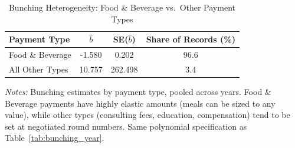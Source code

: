 \begin{table}[t]
\centering
\caption{Bunching Heterogeneity: Food \& Beverage vs.\ Other Payment Types}
\label{tab:het_type}
\begin{threeparttable}
\begin{tabular}{lccc}
\toprule
Payment Type & $\hat{b}$ & SE($\hat{b}$) & Share of Records (\%) \\
\midrule
Food \& Beverage & -1.580 & 0.202 & 96.6 \\
All Other Types & 10.757 & 262.498 & 3.4 \\
\bottomrule
\end{tabular}
\begin{tablenotes}
\item \textit{Notes:} Bunching estimates by payment type, pooled across years.
Food \& Beverage payments have highly elastic amounts (meals can be sized to any value),
while other types (consulting fees, education, compensation) tend to be set at
negotiated round numbers. Same polynomial specification as Table~\ref{tab:bunching_year}.
\end{tablenotes}
\end{threeparttable}
\end{table}

